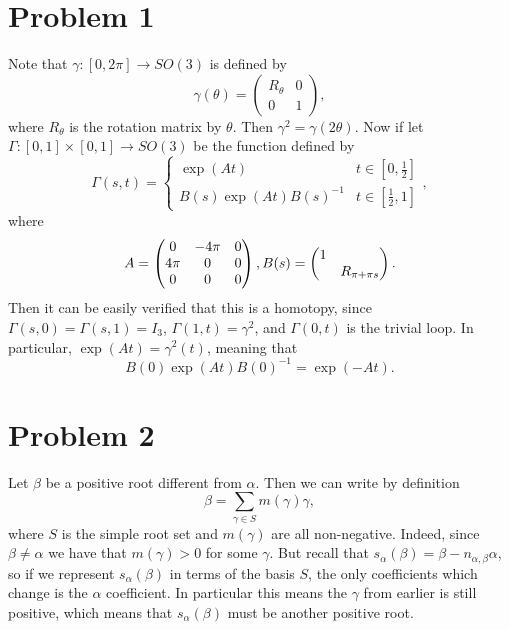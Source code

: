 \documentclass[12pt,letterpaper]{article}
\begin{document}
\section*{Problem 1}

Note that \(\gamma:[0,2\pi]\to SO(3)\) is defined by \[\gamma(\theta)=\begin{pmatrix}
	R_\theta & 0 \\
	0 & 1
\end{pmatrix},\] where \(R_\theta\) is the rotation matrix by \(\theta\). Then \(\gamma^2=\gamma(2\theta)\). Now if let \(\Gamma:[0,1]\times[0,1]\to SO(3)\) be the function defined by 
\[\Gamma(s, t)=\begin{cases}
	\exp(At) & t\in\left[0,\frac{1}{2}\right] \\
	B(s)\exp(At)B(s)^{-1} & t\in\left[\frac{1}{2},1\right] 
\end{cases},\]
where \[
A=\begin{pmatrix}
	0 & -4\pi & 0 \\
	4\pi & 0 & 0 \\
	0 & 0 & 0
\end{pmatrix},	
B(s)=\begin{pmatrix}
	\dmat{1,R_{\pi+\pi s}}
\end{pmatrix}.\]
Then it can be easily verified that this is a homotopy, since \(\Gamma(s,0)=\Gamma(s,1)=I_3\), \(\Gamma(1,t)=\gamma^2\), and \(\Gamma(0,t)\) is the trivial loop. In particular, \(\exp(At)=\gamma^2(t)\), meaning that \[B(0)\exp(At)B(0)^{-1}=\exp(-At).\] 

\section*{Problem 2}

Let \(\beta\) be a positive root different from \(\alpha\). Then we can write by definition \[\beta=\sum_{\gamma\in S} m(\gamma)\gamma,\] where \(S\) is the simple root set and \(m(\gamma)\) are all non-negative. Indeed, since \(\beta\neq\alpha\) we have that \(m(\gamma)>0\) for some \(\gamma\). But recall that \(s_\alpha(\beta)=\beta-n_{\alpha,\beta}\alpha\), so if we represent \(s_\alpha(\beta)\) in terms of the basis \(S\), the only coefficients which change is the \(\alpha\) coefficient. In particular this means the \(\gamma\) from earlier is still positive, which means that \(s_\alpha(\beta)\) must be another positive root. 
\end{document}

